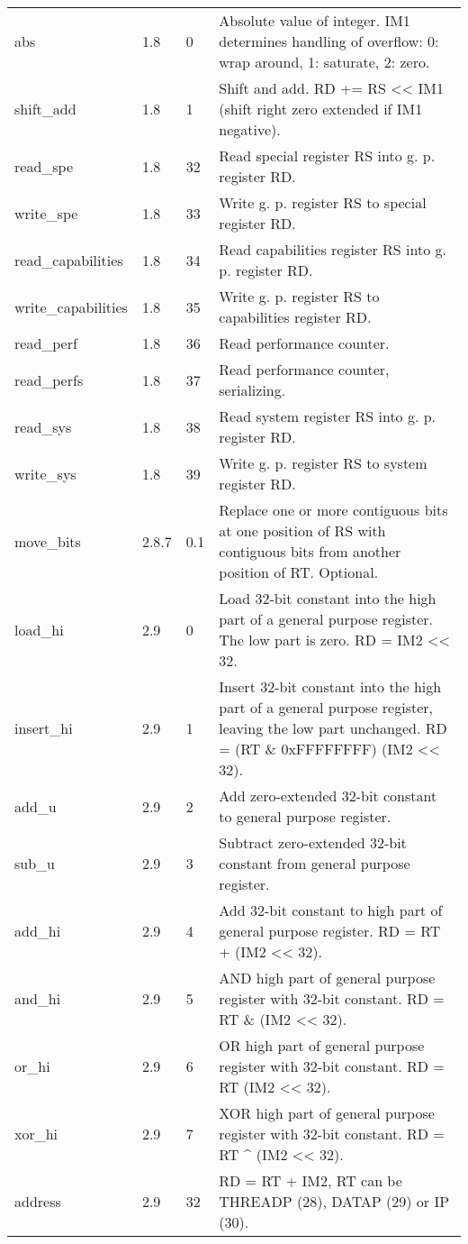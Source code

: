 \documentclass[forwardcom.tex]{subfiles}
\begin{document}
\begin{longtable} {|p{20mm}|p{10mm}|p{8mm}|p{75mm}|}
abs           & 1.8   &  0  & Absolute value of integer. IM1 determines handling of overflow: 0: wrap around, 1: saturate, 2: zero. \\
shift\_add    & 1.8   &  1  & Shift and add. RD += RS \textless\textless{} IM1 (shift right zero extended if IM1 negative). \\
read\_spe     & 1.8   & 32  & Read special register RS into g. p. register RD. \\
write\_spe    & 1.8   & 33  & Write g. p. register RS to special register RD. \\
read\_capabilities & 1.8   & 34  & Read capabilities register RS into g. p. register RD. \\
write\_capabilities & 1.8   & 35  & Write g. p. register RS to capabilities register RD. \\
read\_perf    & 1.8   & 36  & Read performance counter. \\
read\_perfs   & 1.8   & 37  & Read performance counter, serializing. \\
read\_sys     & 1.8   & 38  & Read system register RS into g. p. register RD. \\
write\_sys    & 1.8   & 39  & Write g. p. register RS to system register RD. \\

move\_bits    & 2.8.7 & 0.1 & Replace one or more contiguous bits at one position of RS with contiguous bits from another position of RT. Optional. \\

load\_hi      & 2.9   &  0  & Load 32-bit constant into the high part of a general purpose register. The low part is zero. RD = IM2 \textless\textless{} 32. \\
insert\_hi    & 2.9   &  1  & Insert 32-bit constant into the high part of a general purpose register, leaving the low part unchanged.
RD = (RT \& 0xFFFFFFFF) \textbar{} (IM2 \textless\textless{} 32). \\
add\_u        & 2.9   &  2  & Add zero-extended 32-bit constant to general purpose register. \\
sub\_u        & 2.9   &  3  & Subtract zero-extended 32-bit constant from general purpose register. \\
add\_hi       & 2.9   &  4  & Add 32-bit constant to high part of general purpose register. RD = RT + (IM2 \textless\textless{} 32). \\
and\_hi       & 2.9   &  5  & AND high part of general purpose register with 32-bit constant. RD = RT \& (IM2 \textless\textless{} 32). \\
or\_hi        & 2.9   &  6  & OR high part of general purpose register with 32-bit constant. RD = RT \textbar{} (IM2 \textless\textless{} 32). \\
xor\_hi       & 2.9   &  7  & XOR high part of general purpose register with 32-bit constant. RD = RT \^{} (IM2 \textless\textless{} 32). \\
address       & 2.9   & 32  & RD = RT + IM2, RT can be THREADP (28), DATAP (29) or IP (30). \\
\hline
\end{longtable}
\end{document}
